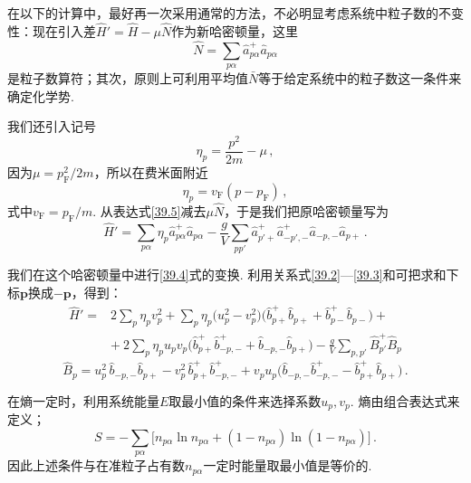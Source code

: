 在以下的计算中，最好再一次采用通常的方法，不必明显考虑系统中粒子数的不变性：现在引入差$\hat H'=\hat H-\mu\hat N$作为新哈密顿量，这里
\begin{equation*}
\hat N = \sum_{p\alpha}\hat a^{+}_{p\alpha}\hat a_{p\alpha}
\end{equation*}
是粒子数算符；其次，原则上可利用平均值$\bar N$等于给定系统中的粒子数这一条件来确定化学势.

我们还引入记号
\begin{equation}
\eta_p = \frac{p^2}{2m} - \mu\,,
\label{39.6}
\end{equation}
因为$\mu=p_{\mathrm F}^2/2m$，所以在费米面附近
\begin{equation}
\eta_p = v_{\mathrm F}(p - p_{\mathrm F})\,,
\label{39.7}
\end{equation}
式中$v_{\mathrm F}=p_{\mathrm F}/m$. 从表达式\eqref{39.5}减去$\mu\hat N$，于是我们把原哈密顿量写为
\begin{equation}
\hat H' = \sum_{p\alpha}\eta_p\hat a^{+}_{p\alpha}\hat a_{p\alpha}
- \frac{g}{V}\sum_{pp'}\hat a^{+}_{p'+}\hat a^{+}_{-p',-}\hat a_{-p,-}\hat a_{p+}\,.
\label{39.8}
\end{equation}

我们在这个哈密顿量中进行\eqref{39.4}式的变换. 利用关系式\eqref{39.2}—\eqref{39.3}和可把求和下标$\bm p$换成$-\bm p$，得到：
\begin{equation}
\begin{aligned}
\hat H' ={}& 2\sum_p\eta_p v_p^2 + \sum_p\eta_p\bigl(u_p^2 - v_p^2\bigr)\bigl(\hat b^{+}_{p+}\hat b_{p+} + \hat b^{+}_{p-}\hat b_{p-}\bigr) + {}\\
&+\ 2\sum_p\eta_p u_pv_p\bigl(\hat b^{+}_{p+}\hat b^{+}_{-p,-} + \hat b_{-p,-}\hat b_{p+}\bigr) - \frac{g}{V}\sum_{p,p'}\hat B^{+}_{p'}\hat B_p
\end{aligned}
\label{39.9}
\end{equation}
\begin{equation*}
\hat B_p = u_p^2\,\hat b_{-p,-}\hat b_{p+} - v_p^2\,\hat b^{+}_{p+}\hat b^{+}_{-p,-}
+ v_pu_p\bigl(\hat b_{-p,-}\hat b^{+}_{-p,-} - \hat b^{+}_{p+}\hat b_{p+}\bigr)\,.
\end{equation*}

在熵一定时，利用系统能量$E$取最小值的条件来选择系数$u_p,v_p$. 熵由组合表达式来定义；
\begin{equation*}
S = -\sum_{p\alpha}\bigl[n_{p\alpha}\ln n_{p\alpha} + (1-n_{p\alpha})\ln(1-n_{p\alpha})\bigr]\,.
\end{equation*}
因此上述条件与在准粒子占有数$n_{p\alpha}$一定时能量取最小值是等价的.

